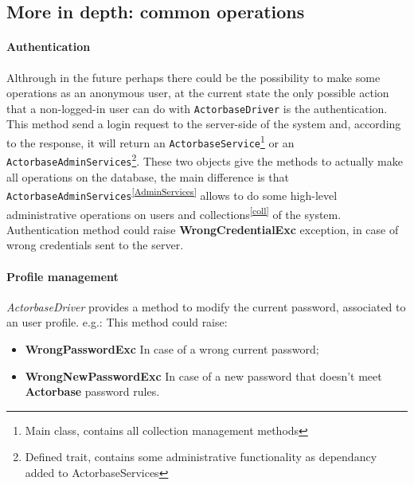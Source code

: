 \documentclass{scalatekids-article}
\begin{document}
\subsection{More in depth: common operations}

\paragraph{Authentication}

Althrough in the future perhaps there could be the possibility to make some
operations as an anonymous user, at the current state the only possible action
that a non-logged-in user can do with \verb=ActorbaseDriver= is the authentication.
This method send a login request to the server-side of the system and, according
to the response, it will return an \verb=ActorbaseService=\footnote{Main class,
  contains all collection management methods\label{ActorbaseServices}} or an
\verb=ActorbaseAdminServices=\footnote{Defined trait, contains some
  administrative functionality as dependancy added to
  ActorbaseServices\label{AdminService}}. These two objects give the methods to
actually make all operations on the database, the main difference is that
\verb=ActorbaseAdminServices=\textsuperscript{\ref{AdminServices}} allows to do
some high-level administrative operations on users and
collections\textsuperscript{\ref{coll}} of the system.\\
Authentication method could raise \textbf{WrongCredentialExc} exception, in case
of wrong credentials sent to the server.

\paragraph{Profile management}

\textit{ActorbaseDriver} provides a method to modify the current password,
associated to an user profile.
e.g.:
This method could raise:
\begin{itemize}
\item \textbf{WrongPasswordExc} In case of a wrong current password;
\item \textbf{WrongNewPasswordExc} In case of a new password that doesn't meet \textbf{Actorbase} password rules.
\end{itemize}
\end{document}
